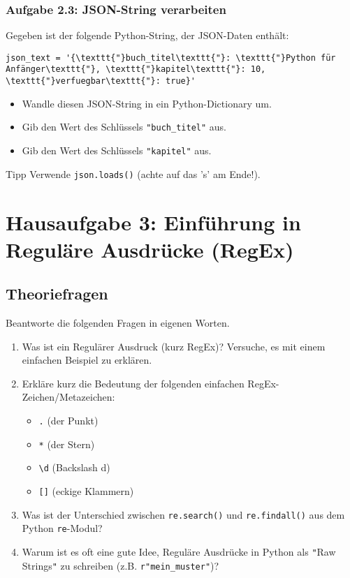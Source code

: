 \documentclass[11pt, a4paper]{article}
\begin{document}
\subsubsection*{Aufgabe 2.3: JSON-String verarbeiten}
Gegeben ist der folgende Python-String, der JSON-Daten enthält:
\begin{lstlisting}
json_text = '{\texttt{"}buch_titel\texttt{"}: \texttt{"}Python für Anfänger\texttt{"}, \texttt{"}kapitel\texttt{"}: 10, \texttt{"}verfuegbar\texttt{"}: true}'
\end{lstlisting}
\begin{itemize}
    \item Wandle diesen JSON-String in ein Python-Dictionary um.
    \item Gib den Wert des Schlüssels \texttt{"}\texttt{buch\_titel}\texttt{"} aus.
    \item Gib den Wert des Schlüssels \texttt{\texttt{"}kapitel\texttt{"}} aus.
\end{itemize}
\begin{infoblock}{Tipp}
Verwende \texttt{json.loads()} (achte auf das 's' am Ende!).
\end{infoblock}

\clearpage
\section*{Hausaufgabe 3: Einführung in Reguläre Ausdrücke (RegEx) \faSearchPlus}

\subsection*{Theoriefragen}
Beantworte die folgenden Fragen in eigenen Worten.

\begin{enumerate}
    \item Was ist ein Regulärer Ausdruck (kurz RegEx)? Versuche, es mit einem einfachen Beispiel zu erklären.
    \item Erkläre kurz die Bedeutung der folgenden einfachen RegEx-Zeichen/Metazeichen:
        \begin{itemize}
            \item \texttt{.} (der Punkt)
            \item \texttt{*} (der Stern)
            \item \texttt{\textbackslash{}d} (Backslash d)
            \item \texttt{[]} (eckige Klammern)
        \end{itemize}
    \item Was ist der Unterschied zwischen \texttt{re.search()} und \texttt{re.findall()} aus dem Python \texttt{re}-Modul?
    \item Warum ist es oft eine gute Idee, Reguläre Ausdrücke in Python als \texttt{"}Raw Strings\texttt{"} zu schreiben (z.B. \texttt{r\texttt{"}mein\_muster\texttt{"}})?
\end{enumerate}
\end{document}
